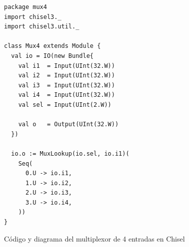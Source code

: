 \vspace{+0.3cm}
\begin{figure}[H]
\centering

\begin{minipage}[c]{0.48\textwidth}
\vspace{0pt}
\begin{lstlisting}[style=scalaStyle]
package mux4
import chisel3._
import chisel3.util._

class Mux4 extends Module {
  val io = IO(new Bundle{
    val i1  = Input(UInt(32.W))
    val i2  = Input(UInt(32.W))
    val i3  = Input(UInt(32.W))
    val i4  = Input(UInt(32.W))
    val sel = Input(UInt(2.W))

    val o   = Output(UInt(32.W))
  })

  io.o := MuxLookup(io.sel, io.i1)(
    Seq(
      0.U -> io.i1,
      1.U -> io.i2,
      2.U -> io.i3,
      3.U -> io.i4,
    ))
}
\end{lstlisting}
\end{minipage}
\hfill
\begin{minipage}[c]{0.48\textwidth}
\centering
{}
\end{minipage}

\caption{Código y diagrama del multiplexor de 4 entradas en Chisel}
\end{figure}

